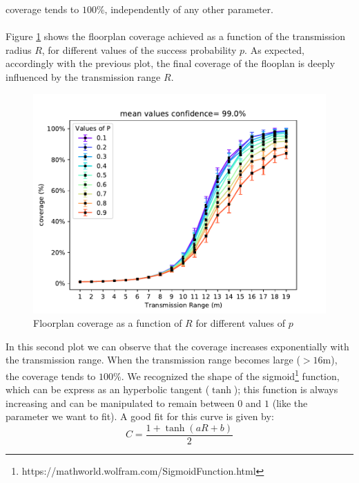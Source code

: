 coverage tends to $100$\%, independently of any other parameter.\\
\\
Figure \ref{fig:floorplancoverage2} shows the floorplan coverage achieved as a
function of the transmission radius $R$, for different values of the success probability $p$. As expected, accordingly with the previous plot, the
final coverage of the flooplan is deeply influenced by the transmission range $R$.
\begin{figure}[H]
    \begin{center}
        \includegraphics[scale=.75]{img/Big_CovRange_mean.pdf}
    \end{center}
    \vspace*{-0.5cm}
    \caption{Floorplan coverage as a function of $R$ for different values of $p$}
    \label{fig:floorplancoverage2}
\end{figure}
\noindent
In this second plot we can observe that the coverage increases exponentially
with the transmission range. When the transmission range becomes large
($> 16$m), the coverage tends to $100$\%. We recognized the shape of the
sigmoid\footnote{https://mathworld.wolfram.com/SigmoidFunction.html} function,
which can be express as an hyperbolic tangent ($\tanh$); this function is always
increasing and can be manipulated to remain between $0$ and $1$ (like the
parameter we want to fit). A good fit for this curve is given by:
\begin{equation*}
    C = \frac{1+\tanh(aR+b)}{2}
\end{equation*}
